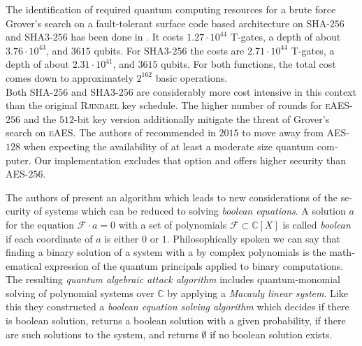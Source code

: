 \documentclass[a4paper,11pt]{article}
\begin{document}
\begin{otherlanguage}{english}
\begin{multicols}{2}
\noindent
The identification of required quantum computing resources for a brute force Grover's search on a fault-tolerant surface code based architecture on \textsc{SHA}-$256$ and \textsc{SHA3}-$256$ has been done in \cite{QSH}. It costs $1.27 \cdot 10^{44}$ T-gates, a depth of about $3.76 \cdot 10^{43}$, and $3615$ qubits. For \textsc{SHA3}-$256$ the costs are $2.71 \cdot 10^{44}$ T-gates, a depth of about $2.31 \cdot 10^{41}$, and $3615$ qubits. For both functions, the total cost comes down to approximately $2^{162}$ basic operations. \\

\noindent
Both \textsc{SHA}-$256$ and \textsc{SHA3}-$256$ are considerably more cost intensive in this context than the original \textsc{Rjindael} key schedule. The higher number of rounds for \textsc{eAES}-$256$ and the $512$-bit key version additionally mitigate the threat of Grover's search on \textsc{eAES}. The authors of \cite{GRO} recommended in $2015$ to move away from \textsc{AES}-$128$ when expecting the availability of at least a moderate size quantum computer. Our implementation excludes that option and offers higher security than \textsc{AES}-$256$. \\


\vspace{0.1cm}

\noindent
The authors of \cite{QAA} present an algorithm which leads to new considerations of the security of systems which can be reduced to solving \textit{boolean equations}. A solution $a$ for the equation $\mathcal{F} \cdot a = 0$ with a set of polynomials $\mathcal{F} \subset \mathbb{C}[X]$ is called \textit{boolean} if each coordinate of $a$ is either $0$ or $1$. Philosophically spoken we can say that finding a binary solution of a system with a by complex polynomials is the mathematical expression of the quantum principals applied to binary computations.\\

\noindent
The resulting \textit{quantum algebraic attack algorithm} includes quantum-monomial solving of polynomial systems over $\mathbb{C}$ by applying a \textit{Macauly linear system}. Like this they constructed a \textit{boolean equation solving algorithm} which decides if there is boolean solution, returns a boolean solution with a given probability, if there are such solutions to the system, and returns $\emptyset$ if no boolean solution exists. \\


\end{multicols}
\end{otherlanguage}
\end{document}
